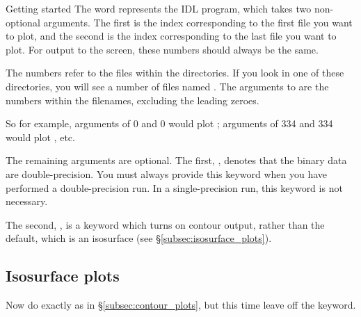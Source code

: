 \begin{chapter}{\label{cha:quickstart}Getting started}
  The word  represents the IDL program, which takes two
  non-optional arguments.  The first is the index corresponding to the first
  file you want to plot, and the second is the index corresponding to the last
  file you want to plot.  For output to the screen, these numbers should always
  be the same.

  The numbers refer to the files within the  directories.  If you
  look in one of these directories, you will see a number of files named
  .  The arguments to  are the numbers
  within the filenames, excluding the leading zeroes.

  So for example, arguments of 0 and 0 would plot ;
  arguments of 334 and 334 would plot , etc.

  The remaining arguments are optional.  The first, , denotes that
  the binary data are double-precision.  You must always provide this keyword
  when you have performed a double-precision run.  In a single-precision run,
  this keyword is not necessary.

  The second, , is a keyword which turns on contour output,
  rather than the default, which is an isosurface (see
  \S\ref{subsec:isosurface_plots}).

  \subsection{\label{subsec:isosurface_plots}Isosurface plots}
  Now do exactly as in \S\ref{subsec:contour_plots}, but this time leave off
  the  keyword.
  

\end{chapter}

